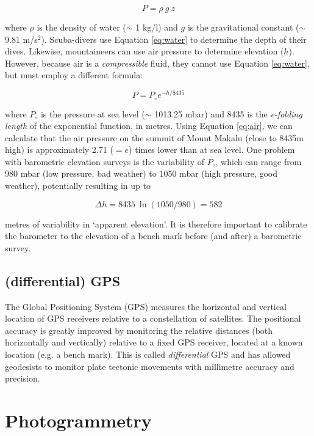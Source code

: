 \documentclass[11pt]{article}
\begin{document}
\begin{equation}
P = \rho ~ g ~ z
\label{eq:water}
\end{equation}

where $\rho$ is the density of water ($\sim$ 1 kg/l) and $g$ is the
gravitational constant ($\sim$9.81 m/s$^2$). Scuba-divers use Equation
\ref{eq:water} to determine the depth of their dives. Likewise,
mountaineers can use air pressure to determine elevation
($h$). However, because air is a {\it compressible} fluid, they cannot
use Equation \ref{eq:water}, but must employ a different formula:

\begin{equation}
P = P_\circ e^{-h/8435}
\label{eq:air}
\end{equation}

where $P_\circ$ is the pressure at sea level ($\sim$ 1013.25 mbar) and
8435 is the {\it e-folding length} of the exponential function, in
metres.  Using Equation \ref{eq:air}, we can calculate that the air
pressure on the summit of Mount Makalu (close to 8435m high) is
approximately 2.71 ($= e$) times lower than at sea level. One problem with
barometric elevation surveys is the variability of $P_\circ$, which
can range from 980 mbar (low pressure, bad weather) to 1050 mbar (high
pressure, good weather), potentially resulting in up to

\begin{equation}
\Delta h = 8435 ~ \ln(1050/980) = 582
\end{equation}

metres of variability in `apparent elevation'. It is therefore
important to calibrate the barometer to the elevation of a bench mark
before (and after) a barometric survey.

\subsection{(differential) GPS}

The Global Positioning System (GPS) measures the horizontal and
vertical location of GPS receivers relative to a constellation of
satellites.  The positional accuracy is greatly improved by monitoring
the relative distances (both horizontally and vertically) relative to
a fixed GPS receiver, located at a known location (e.g. a bench
mark). This is called {\it differential} GPS and has allowed
geodesists to monitor plate tectonic movements with millimetre
accuracy and precision.

\section{Photogrammetry}
\label{sec:photogrammetry}
\end{document}
